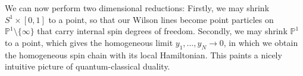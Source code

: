 \documentclass[11pt]{report}
\theoremstyle{definition}
\theoremstyle{remark}
\theoremstyle{remark}
\renewcommand{\P}{\mathbb{P}}
\begin{document}
We can now perform two dimensional reductions: Firstly, we may shrink $S^1 \times [0,1]$ to a point, so that our Wilson lines become point particles on $\P^1 \setminus \{ \infty \}$ that carry internal spin degrees of freedom. Secondly, we may shrink $\P^1$ to a point, which gives the homogeneous limit $y_1,...,y_N \to 0$, in which we obtain the homogeneous spin chain with its local Hamiltonian. This paints a nicely intuitive picture of quantum-classical duality.

\end{document}
